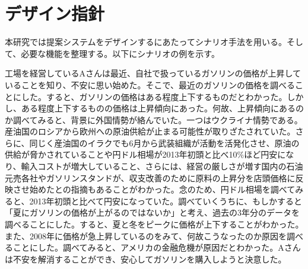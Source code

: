 \documentclass{matsushita-zemi}
\begin{document}
\section{デザイン指針}
本研究では提案システムをデザインするにあたってシナリオ手法を用いる。そして、必要な機能を整理する。以下にシナリオの例を示す。
\begin{screen}
工場を経営しているAさんは最近、自社で扱っているガソリンの価格が上昇していることを知り、不安に思い始めた。そこで、最近のガソリンの価格を調べることにした。すると、ガソリンの価格はある程度上下するものだとわかった。しかし、ある程度上下するものの価格は上昇傾向にあった。何故、上昇傾向にあるのか調べてみると、背景に外国情勢が絡んでいた。一つはウクライナ情勢である。産油国のロシアから欧州への原油供給が止まる可能性が取りざたされていた。さらに、同じく産油国のイラクでも6月から武装組織が活動を活発化させ、原油の供給が脅かされていることや円ドル相場が2013年初頭と比べ10\%ほど円安になり、輸入コストが増大していること、さらには、経営の厳しさが増す国内の石油元売各社やガソリンスタンドが、収支改善のために原料の上昇分を店頭価格に反映させ始めたとの指摘もあることがわかった。念のため、円ドル相場を調べてみると、2013年初頭と比べて円安になっていた。調べていくうちに、もしかすると「夏にガソリンの価格が上がるのではないか」と考え、過去の3年分のデータを調べることにした。すると、夏と冬をピークに価格が上下することがわかった。また、2008年に価格が急上昇しているのをみて、何故こうなったのか原因を調べることにした。調べてみると、アメリカの金融危機が原因だとわかった。Aさんは不安を解消することができ、安心してガソリンを購入しようと決意した。
\end{screen}
\end{document}
